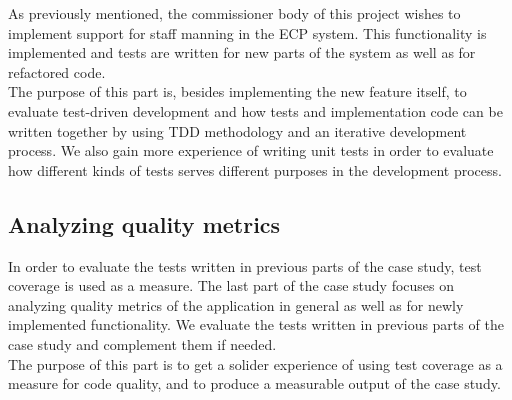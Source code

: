 As previously mentioned, the commissioner body of this project wishes to
implement support for staff manning in the ECP system. This
functionality is implemented and tests are written for new parts of the
system as well as for refactored code.\\

The purpose of this part is, besides implementing the new feature
itself, to evaluate test-driven development and how tests and
implementation code can be written together by using TDD methodology and
an iterative development process. We also gain more experience of
writing unit tests in order to evaluate how different kinds of tests
serves different purposes in the development process.\\


\subsection{Analyzing quality metrics}
\label{sec:casestudy_3}

In order to evaluate the tests written in previous parts of the case
study, test coverage is used as a measure. The last part of the case
study focuses on analyzing quality metrics of the application in general
as well as for newly implemented functionality. We evaluate the tests
written in previous parts of the case study and complement them if
needed.\\

The purpose of this part is to get a solider experience of using test
coverage as a measure for code quality, and to produce a measurable
output of the case study.\\
